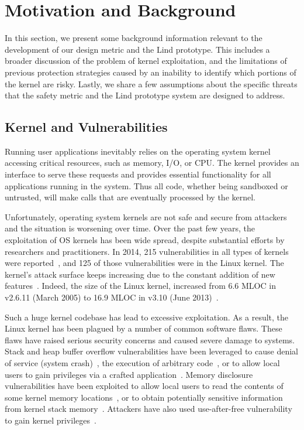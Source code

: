 \section{Motivation and Background}
\label{sec.motivation-and-background}

In this section, we present some background information 
relevant to the development of our design metric and the Lind prototype. 
This includes a broader discussion of the problem of kernel exploitation, 
and the limitations of previous protection strategies caused by 
an inability to identify which portions of the kernel are risky. 
Lastly, we share a few assumptions about the specific threats 
that the safety metric and the Lind prototype system are designed to
address.

\subsection{Kernel and Vulnerabilities}

Running user applications inevitably relies on the operating system kernel 
accessing critical resources, such as memory, I/O, or CPU. 
The kernel provides an interface to serve these requests 
and provides essential functionality for all applications running in the
system. 
Thus all code, whether being sandboxed or untrusted, will make calls 
that are eventually processed by the kernel. 

Unfortunately, operating system kernels are not safe and secure from
attackers and the situation is worsening over time. 
Over the past few years, the exploitation of OS kernels has been wide
spread, 
despite substantial efforts by researchers and practitioners. 
In 2014, 215 vulnerabilities in all types of kernels were reported~\cite{NVD}, 
and 125 of those vulnerabilities were in the Linux kernel. 
The kernel's
attack surface keeps increasing due to the constant addition of new
features~\cite{Metrics-13}. 
Indeed, the size of the Linux kernel, increased from 6.6 MLOC in v2.6.11 
(March 2005) to 16.9 MLOC in v3.10 (June 2013)~\cite{Linux-13}. 


Such a huge kernel codebase has lead to excessive exploitation. 
As a result, the Linux kernel has been plagued by a number of common
software flaws. 
These flaws have raised serious security concerns and caused severe damage
to systems. 
Stack and heap buffer overflow vulnerabilities have been leveraged to 
cause denial of service (system crash)~\cite{CVE-2013-2892}, 
the execution of arbitrary code~\cite{CVE-2009-3234}, 
or to allow local users to gain privileges via a crafted 
application~\cite{CVE-2013-1828}. 
Memory disclosure vulnerabilities have been exploited to allow local users
to read 
the contents of some kernel memory locations~\cite{CVE-2009-3002}, or to
obtain potentially 
sensitive information from kernel stack memory~\cite{CVE-2010-4073}. 
Attackers have also used use-after-free vulnerability to gain kernel
privileges~\cite{CVE-2013-4343}.

